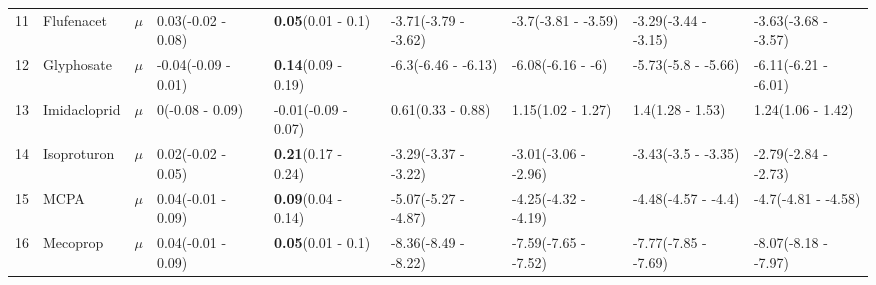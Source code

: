 \begin{longtable}{lp{2cm}p{0.6cm}p{1.8cm}p{1.8cm}p{1.8cm}p{1.8cm}p{1.8cm}p{1.8cm}}
  11 & Flufenacet & $\mu$ & 0.03\newline (-0.02 - 0.08) & \textbf{0.05}\newline (0.01 - 0.1) & -3.71\newline (-3.79 - -3.62) & -3.7\newline (-3.81 - -3.59) & -3.29\newline (-3.44 - -3.15) & -3.63\newline (-3.68 - -3.57) \\ 
  12 & Glyphosate & $\mu$ & -0.04\newline (-0.09 - 0.01) & \textbf{0.14}\newline (0.09 - 0.19) & -6.3\newline (-6.46 - -6.13) & -6.08\newline (-6.16 - -6) & -5.73\newline (-5.8 - -5.66) & -6.11\newline (-6.21 - -6.01) \\ 
  13 & Imidacloprid & $\mu$ & 0\newline (-0.08 - 0.09) & -0.01\newline (-0.09 - 0.07) & 0.61\newline (0.33 - 0.88) & 1.15\newline (1.02 - 1.27) & 1.4\newline (1.28 - 1.53) & 1.24\newline (1.06 - 1.42) \\ 
  14 & Isoproturon & $\mu$ & 0.02\newline (-0.02 - 0.05) & \textbf{0.21}\newline (0.17 - 0.24) & -3.29\newline (-3.37 - -3.22) & -3.01\newline (-3.06 - -2.96) & -3.43\newline (-3.5 - -3.35) & -2.79\newline (-2.84 - -2.73) \\ 
  15 & MCPA & $\mu$ & 0.04\newline (-0.01 - 0.09) & \textbf{0.09}\newline (0.04 - 0.14) & -5.07\newline (-5.27 - -4.87) & -4.25\newline (-4.32 - -4.19) & -4.48\newline (-4.57 - -4.4) & -4.7\newline (-4.81 - -4.58) \\ 
  16 & Mecoprop & $\mu$ & 0.04\newline (-0.01 - 0.09) & \textbf{0.05}\newline (0.01 - 0.1) & -8.36\newline (-8.49 - -8.22) & -7.59\newline (-7.65 - -7.52) & -7.77\newline (-7.85 - -7.69) & -8.07\newline (-8.18 - -7.97) \\ 

\end{longtable}
